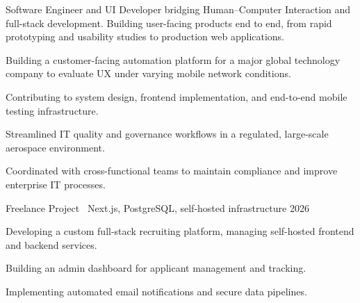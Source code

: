\documentclass[10pt]{article}
\begin{document}
\makecvheader

Software Engineer and UI Developer bridging Human--Computer Interaction and
full-stack development. Building user-facing products end to end, from rapid
prototyping and usability studies to production web applications.


\begin{cvitems}
  \item Building a customer-facing automation platform for a major global
        technology company to evaluate UX under varying mobile network conditions.
  \item Contributing to system design, frontend implementation, and end-to-end
        mobile testing infrastructure.
\end{cvitems}

\begin{cvitems}
  \item Streamlined IT quality and governance workflows in a regulated,
        large-scale aerospace environment.
  \item Coordinated with cross-functional teams to maintain compliance and
        improve enterprise IT processes.
\end{cvitems}


%
  {Freelance Project \textbullet\ Next.js, PostgreSQL, self-hosted infrastructure}%
  {2026}
\begin{cvitems}
  \item Developing a custom full-stack recruiting platform, managing
        self-hosted frontend and backend services.
  \item Building an admin dashboard for applicant management and tracking.
  \item Implementing automated email notifications and secure data pipelines.
\end{cvitems}
\end{document}
